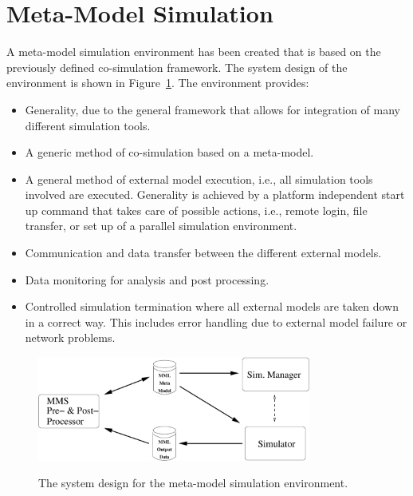 \section{Meta-Model Simulation}
A meta-model simulation environment has been created that is based on
the previously defined co-simulation framework. The system design of
the environment is shown in Figure~\ref{fig:SystemDesign}. The
environment provides:
\begin{itemize}
\item Generality, due to the general framework
	that allows for integration of many different simulation
	tools.
\item A generic method of co-simulation based on a meta-model.
\item A general method of external model execution, i.e., all
	simulation tools involved are executed. Generality is achieved
	by a platform independent start up command that takes care of
	possible actions, i.e., remote login, file transfer, or set up
	of a parallel simulation environment.
\item Communication and data transfer between the different external
	models.
\item Data monitoring for analysis and post processing.
\item Controlled simulation termination where all external models are
	taken down in a correct way. This includes error handling due
	to external model failure or network problems.
\end{itemize}

\begin{figure}[ht]\begin{center}
   {\includegraphics[width=9cm]{figs/MetaModelSysDesign2.pdf}}
    \caption{The system design for the meta-model simulation
    environment. } \label{fig:SystemDesign}
\end{center}\end{figure}


